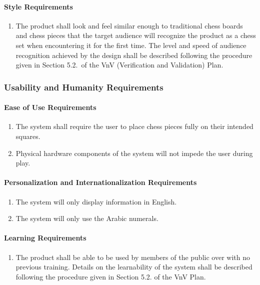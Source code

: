 \documentclass[12pt]{article}
\begin{document}
\paragraph{Style Requirements}
\begin{enumerate}[{LF}1., leftmargin=2\parindent, resume]
    \item The product shall look and feel similar enough to traditional chess boards and chess pieces that the target audience will 
    recognize the product as a chess set when encountering it for the first time. The level and speed of audience recognition achieved 
    by the design shall be described following the procedure given in Section 5.2.\thevnvSectionNfr{}~of the VnV 
    (Verification and Validation) Plan.
\end{enumerate}



\subsubsection{Usability and Humanity Requirements}
\label{NFR_UH}
\paragraph{Ease of Use Requirements}
\begin{enumerate}[{UH}1., leftmargin=2\parindent]
    \item The system shall require the user to place chess pieces fully on their intended squares.
    \item Physical hardware components of the system will not impede the user during play.
\end{enumerate}

\paragraph{Personalization and Internationalization Requirements}
\begin{enumerate}[{UH}1., leftmargin=2\parindent, resume]
    \item The system will only display information in English.
    \item The system will only use the Arabic numerals.
\end{enumerate}

\paragraph{Learning Requirements}
\begin{enumerate}[{UH}1., leftmargin=2\parindent, resume]
    \item The product shall be able to be used by members of the public over with no previous training. Details on the learnability 
    of the system shall be described following the procedure given in Section 5.2.\thevnvSectionNfr{}
    of the VnV Plan.
\end{enumerate}
\end{document}

